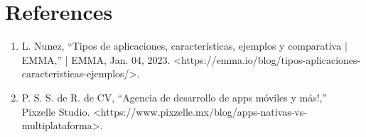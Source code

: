 \documentclass{article}
\begin{document}
	\section{References}
	\begin{enumerate}
		\item L. Nunez, “Tipos de aplicaciones, características, ejemplos y comparativa | EMMA,” | EMMA, Jan. 04, 2023. \textless https://emma.io/blog/tipos-aplicaciones-caracteristicas-ejemplos/\textgreater.
		\item P. S. S. de R. de CV, “Agencia de desarrollo de apps móviles y más!,” Pixzelle Studio. \textless https://www.pixzelle.mx/blog/apps-nativas-vs-multiplataforma\textgreater.
	\end{enumerate}
	
\end{document}
